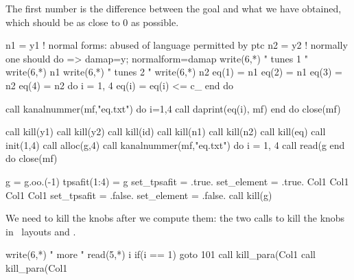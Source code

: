 The first number is the difference between the goal and what we have
obtained, which should be as close to 0 as possible.

\begin{ptccode}
n1 = y1 ! normal forms: abused of language permitted by ptc
n2 = y2 ! normally one should do => damap=y; normalform=damap
write(6,*) " tunes 1 "
write(6,*) n1%
write(6,*) " tunes 2 "
write(6,*) n2%
eq(1) = n1%
eq(2) = n1%
eq(3) = n2%
eq(4) = n2%
do i = 1, 4
  eq(i) = eq(i) <= c_%
end do

call kanalnummer(mf,"eq.txt")
do i=1,4
  call daprint(eq(i), mf)
end do
close(mf)

call kill(y1)
call kill(y2)
call kill(id)
call kill(n1)
call kill(n2)
call kill(eq)
call init(1,4)
call alloc(g,4)
call kanalnummer(mf,"eq.txt")
do i = 1, 4
  call read(g%
end do
close(mf)

g = g.oo.(-1)
tpsafit(1:4) = g
set_tpsafit = .true.
set_element = .true.
Col1%
Col1%
Col1%
Col1%
set_tpsafit = .false.
set_element = .false.
call kill(g)
\end{ptccode}

We need to kill the knobs after we compute them: the two calls to
 kill the knobs in \DNA\ layouts  and
.

\begin{ptccode}
write(6,*) " more "
read(5,*) i
if(i == 1) goto 101
call kill_para(Col1%
call kill_para(Col1%
\end{ptccode}

\endinput
